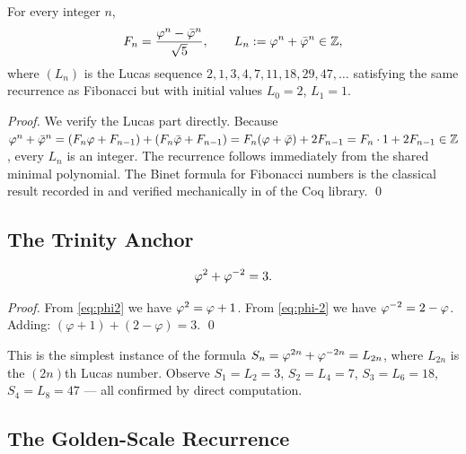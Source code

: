 \begin{lemma}\label{lem:gs-binet}
For every integer \(n\),
\[
  F_n = \frac{\varphi^{n} - \bar\varphi^n}{\sqrt{5}} ,
  \qquad
  L_n := \varphi^{n} + \bar\varphi^n \in \mathbb{Z} ,
\]
where \((L_n)\) is the Lucas sequence \(2, 1, 3, 4, 7, 11, 18, 29,
47, \ldots\) satisfying the same recurrence as Fibonacci but with
initial values \(L_0 = 2\), \(L_1 = 1\).
\end{lemma}

\begin{proof}
We verify the Lucas part directly.  Because
\(\varphi^{n} + \bar\varphi^n = (F_n\varphi + F_{n-1}) + (F_n\bar\varphi +
F_{n-1}) = F_n(\varphi + \bar\varphi) + 2F_{n-1} = F_n \cdot 1 + 2F_{n-1}
\in \mathbb{Z}\), every \(L_n\) is an integer.  The recurrence follows
immediately from the shared minimal polynomial.  The Binet formula for
Fibonacci numbers is the classical result recorded in \cite{koshy_fib_lucas}
and verified mechanically in  of
the Coq library.
\qed
\end{proof}

\subsection{The Trinity Anchor}
\label{subsec:gs-anchor}

\begin{lemma}\label{lem:gs-anchor}
\[
  \varphi^{2} + \varphi^{-2} = 3 .
\]
\end{lemma}

\begin{proof}
From \eqref{eq:phi2} we have \(\varphi^{2} = \varphi + 1\).
From \eqref{eq:phi-2} we have \(\varphi^{-2} = 2 - \varphi\).
Adding: \((\varphi+1) + (2-\varphi) = 3\).
\qed
\end{proof}

\noindent
{}

\medskip
This is the simplest instance of the formula \(S_n = \varphi^{2n} +
\varphi^{-2n} = L_{2n}\), where \(L_{2n}\) is the \((2n)\)th Lucas
number.  Observe \(S_1 = L_2 = 3\), \(S_2 = L_4 = 7\),
\(S_3 = L_6 = 18\), \(S_4 = L_8 = 47\) — all confirmed by direct
computation.

\subsection{The Golden-Scale Recurrence}
\label{subsec:gs-recurrence}

